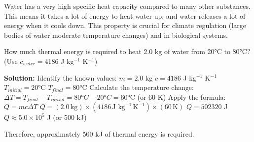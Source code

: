 Water has a very high specific heat capacity compared to many other substances. This means it takes a lot of energy to heat water up, and water releases a lot of energy when it cools down. This property is crucial for climate regulation (large bodies of water moderate temperature changes) and in biological systems.

\begin{example}
How much thermal energy is required to heat 2.0 kg of water from 20°C to 80°C? (Use \(c_{water} = 4186\) J kg\(^{-1}\) K\(^{-1}\))

\textbf{Solution:}
Identify the known values:
\(m = 2.0\) kg
\(c = 4186\) J kg\(^{-1}\) K\(^{-1}\)
\(T_{initial} = 20\)°C
\(T_{final} = 80\)°C
Calculate the temperature change:
\(\Delta T = T_{final} - T_{initial} = 80°C - 20°C = 60\)°C (or 60 K)
Apply the formula:
\(Q = mc\Delta T\)
\(Q = (2.0\,\text{kg}) \times (4186\,\text{J kg}^{-1}\,\text{K}^{-1}) \times (60\,\text{K})\)
\(Q = 502320\) J
\(Q \approx 5.0 \times 10^5\) J (or 500 kJ)

Therefore, approximately 500 kJ of thermal energy is required.
\end{example}

